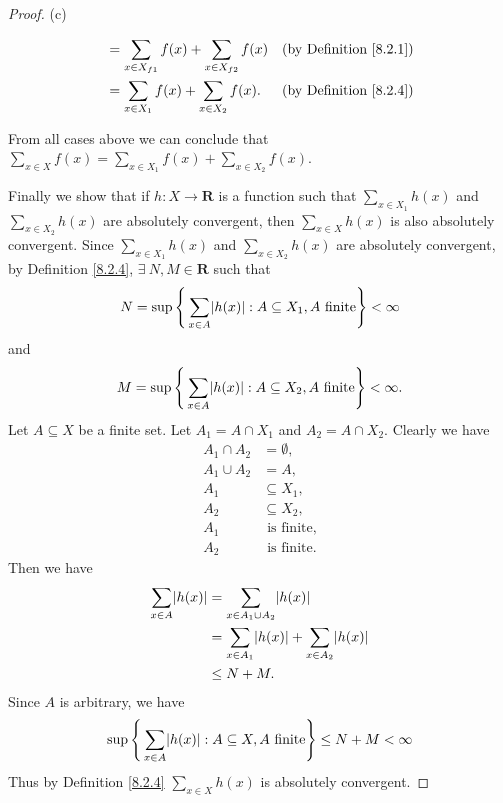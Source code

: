 \begin{proof}{(c)}
\begin{enumerate}[label=(\Roman*)]
\begin{enumerate}[label=(\roman*)]
\begin{align*}
                             & = \sum_{x \in X_{f1}} f(x) + \sum_{x \in X_{f2}} f(x)                   & \text{(by Definition \ref{8.2.1})} \\
                             & = \sum_{x \in X_1} f(x) + \sum_{x \in X_2} f(x).                        & \text{(by Definition \ref{8.2.4})}
                        \end{align*}
              \end{enumerate}
    \end{enumerate}
    From all cases above we can conclude that \(\sum_{x \in X} f(x) = \sum_{x \in X_1} f(x) + \sum_{x \in X_2} f(x)\).

    Finally we show that if \(h : X \to \mathbf{R}\) is a function such that \(\sum_{x \in X_1} h(x)\) and \(\sum_{x \in X_2} h(x)\) are absolutely convergent, then \(\sum_{x \in X} h(x)\) is also absolutely convergent.
    Since \(\sum_{x \in X_1} h(x)\) and \(\sum_{x \in X_2} h(x)\) are absolutely convergent, by Definition \ref{8.2.4}, \(\exists\ N, M \in \mathbf{R}\) such that
    \[
        N = \sup\Bigg\{\sum_{x \in A} \abs*{h(x)} : A \subseteq X_1, A \text{ finite}\Bigg\} < \infty
    \]
    and
    \[
        M = \sup\Bigg\{\sum_{x \in A} \abs*{h(x)} : A \subseteq X_2, A \text{ finite}\Bigg\} < \infty.
    \]
    Let \(A \subseteq X\) be a finite set.
    Let \(A_1 = A \cap X_1\) and \(A_2 = A \cap X_2\).
    Clearly we have
    \begin{align*}
        A_1 \cap A_2 & = \emptyset,       \\
        A_1 \cup A_2 & = A,               \\
        A_1          & \subseteq X_1,     \\
        A_2          & \subseteq X_2,     \\
        A_1          & \text{ is finite}, \\
        A_2          & \text{ is finite}.
    \end{align*}
    Then we have
    \begin{align*}
        \sum_{x \in A} \abs*{h(x)} & = \sum_{x \in A_1 \cup A_2} \abs*{h(x)}                       \\
                                   & = \sum_{x \in A_1} \abs*{h(x)} + \sum_{x \in A_2} \abs*{h(x)} \\
                                   & \leq N + M.
    \end{align*}
    Since \(A\) is arbitrary, we have
    \[
        \sup\Bigg\{\sum_{x \in A} \abs*{h(x)} : A \subseteq X, A \text{ finite}\Bigg\} \leq N + M < \infty
    \]
    Thus by Definition \ref{8.2.4} \(\sum_{x \in X} h(x)\) is absolutely convergent.
\end{proof}

